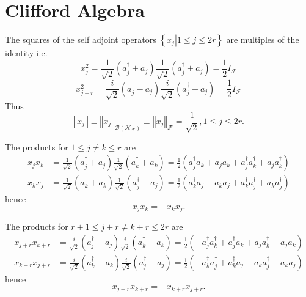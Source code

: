 \documentclass[aps, preprint]{revtex4}
\begin{document}
\section{Clifford Algebra}
The squares of the self adjoint operators $\left \{\left .x_{j}\right \vert 1 \leq j \leq 2 r\right \}$ are multiples of the identity i.e.
\begin{equation}x_{j}^{2} =\frac{1}{\sqrt{2}} \left (a_{j}^{ \dag } +a_{j}\right ) \frac{1}{\sqrt{2}} \left (a_{j}^{ \dag } +a_{j}\right ) =\frac{1}{2} I_{\mathcal{F}}
\end{equation}
\begin{equation}x_{j +r}^{2} =\frac{i}{\sqrt{2}} \left (a_{j}^{ \dag } -a_{j}\right ) \frac{i}{\sqrt{2}} \left (a_{j}^{ \dag } -a_{j}\right ) =\frac{1}{2} I_{\mathcal{F}}
\end{equation}Thus
\begin{equation}\left \Vert x_{j}\right \Vert  \equiv \left \Vert x_{j}\right \Vert _{\mathcal{B} \left (\mathcal{H}_{\mathcal{F}}\right )} \equiv \left \Vert x_{j}\right \Vert _{\mathcal{F}} =\frac{1}{\sqrt{2}} ,1 \leq j \leq 2 r\text{.}
\end{equation}

The products for $1 \leq j \neq k \leq r$ are
\begin{align}x_{j} x_{k} &  =\frac{1}{\sqrt{2}} \left (a_{j}^{ \dag } +a_{j}\right ) \frac{1}{\sqrt{2}} \left (a_{k}^{ \dag } +a_{k}\right ) =\frac{1}{2} \left (a_{j}^{ \dag } a_{k} +a_{j} a_{k} +a_{j}^{ \dag } a_{k}^{ \dag } +a_{j} a_{k}^{ \dag }\right ) \nonumber  \\
x_{k} x_{j} &  =\frac{1}{\sqrt{2}} \left (a_{k}^{ \dag } +a_{k}\right ) \frac{1}{\sqrt{2}} \left (a_{j}^{ \dag } +a_{j}\right ) =\frac{1}{2} \left (a_{k}^{ \dag } a_{j} +a_{k} a_{j} +a_{k}^{ \dag } a_{j}^{ \dag } +a_{k} a_{j}^{ \dag }\right )\end{align}hence
\begin{equation}x_{j} x_{k} = -x_{k} x_{j}\text{.}
\end{equation}

The products for $r +1 \leq j +r \neq k +r \leq 2 r$ are
\begin{align}x_{j +r} x_{k +r} &  =\frac{i}{\sqrt{2}} \left (a_{j}^{ \dag } -a_{j}\right ) \frac{i}{\sqrt{2}} \left (a_{k}^{ \dag } -a_{k}\right ) =\frac{1}{2} \left ( -a_{j}^{ \dag } a_{k}^{ \dag } +a_{j}^{ \dag } a_{k} +a_{j} a_{k}^{ \dag } -a_{j} a_{k}\right ) \nonumber  \\
x_{k +r} x_{j +r} &  =\frac{i}{\sqrt{2}} \left (a_{k}^{ \dag } -a_{k}\right ) \frac{i}{\sqrt{2}} \left (a_{j}^{ \dag } -a_{j}\right ) =\frac{1}{2} \left ( -a_{k}^{ \dag } a_{j}^{ \dag } +a_{k}^{ \dag } a_{j} +a_{k} a_{j}^{ \dag } -a_{k} a_{j}\right )\end{align}hence
\begin{equation}x_{j +r} x_{k +r} = -x_{k +r} x_{j +r}\text{.}
\end{equation}
\end{document}

